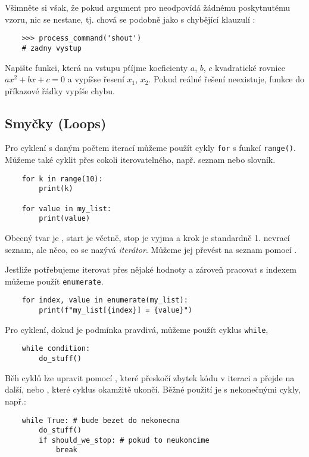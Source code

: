 Všimněte si však, že pokud argument pro  neodpovídá žádnému poskytnutému vzoru, nic se nestane, tj. chová se podobně jako  s chybějící klauzulí :
\begin{lstlisting}
    >>> process_command('shout')
    # zadny vystup
\end{lstlisting}

\begin{exercise}
Napište funkci, která na vstupu pťíjme koeficienty $a$, $b$, $c$ kvadratické rovnice $ax^2 + bx + c = 0$ a vypíšse řesení $x_1$, $x_2$. 
Pokud reálné řešení neexistuje, funkce do příkazové řádky vypíše chybu.
\end{exercise}

\subsection{Smyčky (Loops)}
Pro cyklení s daným počtem iterací můžeme použít cykly \verb|for| s funkcí \verb|range()|. Můžeme také cyklit přes cokoli iterovatelného, např. seznam nebo slovník.
\begin{lstlisting}
    for k in range(10):
        print(k)

    for value in my_list:
        print(value) 
\end{lstlisting}
Obecný tvar  je , start je včetně, stop je vyjma a krok je standardně 1.  nevrací seznam, ale něco, co se nazývá \emph{iterátor}. Můžeme jej převést na seznam pomocí .

Jestliže potřebujeme iterovat přes nějaké hodnoty a zároveň pracovat s indexem můžeme použít \lstinline{enumerate}.
\begin{lstlisting}
    for index, value in enumerate(my_list):
        print(f"my_list[{index}] = {value}")
\end{lstlisting}

Pro cyklení, dokud je podmínka pravdivá, můžeme použít cyklus \verb|while|,
\begin{lstlisting}
    while condition:
        do_stuff()
\end{lstlisting}

Běh cyklů lze upravit pomocí , které přeskočí zbytek kódu v iteraci a přejde na další, nebo , které cyklus okamžitě ukončí. Běžné použití je s nekonečnými cykly, např.:
\begin{lstlisting}
    while True: # bude bezet do nekonecna
        do_stuff()
        if should_we_stop: # pokud to neukoncime
            break
\end{lstlisting}

